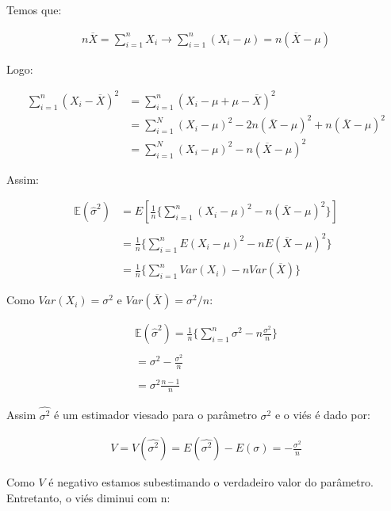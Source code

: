 \documentclass[
  letterpaper,
  DIV=11,
  numbers=noendperiod]{scrartcl}
\begin{document}
Temos que:

\[\begin{array}{c}
n \overline{X}=\sum_{i=1}^{n}X_i \rightarrow \sum_{i=1}^{n}(X_i - \mu)=n(\overline{X}-\mu)
\end{array}\]

Logo:

\begin{equation}
      \begin{split}
\sum_{i=1}^{n}(X_i - \overline{X})^{2} & = \sum_{i=1}^{n}(X_i - \mu + \mu - \overline{X})^{2} \\ 
& = \sum_{i=1}^{N}(X_i - \mu)^{2}  - 2 n (\overline{X} - \mu)^{2} + n(\overline{X}  - \mu)^{2} \\
& =\sum_{i=1}^{N}(X_i - \mu)^{2}  - n (\overline{X} - \mu)^{2}
    \end{split}
\end{equation}

Assim:

\[\begin{array}{ccc}
\mathbb{E}(\hat{\sigma}^{2})&=E[\frac{1}{n}\{ \sum_{i=1}^{n}(X_i - \mu)^{2}  - n (\overline{X} - \mu)^{2} \}]
\\
\\
&=\frac{1}{n}\{ \sum_{i=1}^{n}E (X_i - \mu)^{2}  - n E (\overline{X} - \mu)^{2} \}
\\
\\
&=\frac{1}{n}\{ \sum_{i=1}^{n}Var(X_i)  - n Var(\overline{X}) \}
\end{array}\]

Como \(Var(X_i)=\sigma^{2}\) e \(Var(\overline{X})=\sigma^{2}/n\):

\[\begin{array}{ccc}
\mathbb{E}(\hat{\sigma}^{2})=\frac{1}{n}\{ \sum_{i=1}^{n} \sigma^{2} - n \frac{ \sigma^{2}}{n} \}
\\
\\
= \sigma^{2} - \frac{ \sigma^{2}}{n}
\\
\\
=\sigma^{2}\frac{n-1}{n}
\end{array}\]

Assim \(\hat{\sigma^{2}}\) é um estimador viesado para o parâmetro
\(\sigma^{2}\) e o viés é dado por:

\[\begin{array}{ccc}
V = V(\hat{\sigma^{2}})= E(\hat{\sigma^{2}})-E(\sigma)=-\frac{\sigma^{2}}{n}
\end{array}\]

Como \(V\) é negativo estamos subestimando o verdadeiro valor do
parâmetro. Entretanto, o viés diminui com n:
\end{document}
